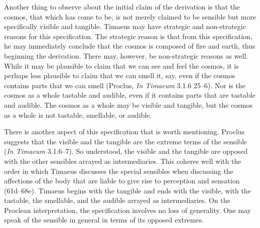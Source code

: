 Another thing to observe about the initial claim of the derivation is that the cosmos, that which has come to be, is not merely claimed to be sensible but more specifically visible and tangible. Timaeus may have strategic and non-strategic reasons for this specification. The strategic reason is that from this specification, he may immediately conclude that the cosmos is composed of fire and earth, thus beginning the derivation. There may, however, be non-strategic reasons as well. While it may be plausible to claim that we can see and feel the cosmos, it is perhaps less plausible to claim that we can smell it, say, even if the cosmos contains parts that we can smell (Proclus, \emph{In Timaeum} 3.1.6 25--6). Nor is the cosmos as a whole tastable and audible, even if it contains parts that are tastable and audible. The cosmos as a whole may be visible and tangible, but the cosmos as a whole is not tastable, smellable, or audible.

There is another aspect of this specification that is worth mentioning. Proclus suggests that the visible and the tangible are the extreme terms of the sensible (\emph{In Timaeum} 3.1.6--7). So understood, the visible and the tangible are opposed with the other sensibles arrayed as intermediaries. This coheres well with the order in which Timaeus discusses the special sensibles when discussing the affections of the body that are liable to give rise to perception and sensation (61d--68e). Timaeus begins with the tangible and ends with the visible, with the tastable, the smellable, and the audible arrayed as intermediaries. On the Proclean interpretation, the specification involves no loss of generality. One may speak of the sensible in general in terms of its opposed extremes. 

